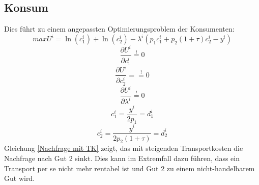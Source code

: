 \subsection{Konsum}
Dies f{\"u}hrt zu einem angepassten Optimierungsproblem der Konsumenten: 
\begin{equation} maxU^i=\ln(c^i_1)+\ln(c^i_2)-\lambda^i (p_1c^i_1+p_2(1+\tau)c^i_2-y^i)\end{equation}
\begin{equation}\frac{\partial U^i}{\partial c^i_1}\overset{!}{=}0\end{equation}
\begin{equation} \frac{\partial U^i}{\partial c^i_2}=\overset{!}{=}0\end{equation}
\begin{equation} \frac{\partial U^i}{\partial \lambda^i}\overset{!}{=}0\end{equation}
\begin{equation} c^i_1=\frac{y^i}{2p_1}=d^i_1\end{equation}
\begin{equation} c^i_2=\frac{y^i}{2p_2(1+\tau)}=d^i_2\label{Nachfrage mit TK}\end{equation}
Gleichung \eqref{Nachfrage mit TK} zeigt, das mit steigenden Transportkosten die Nachfrage nach Gut 2 sinkt. Dies kann im Extremfall dazu f{\"u}hren, dass ein Transport per se nicht mehr rentabel ist und Gut 2 zu einem nicht-handelbarem Gut wird.

